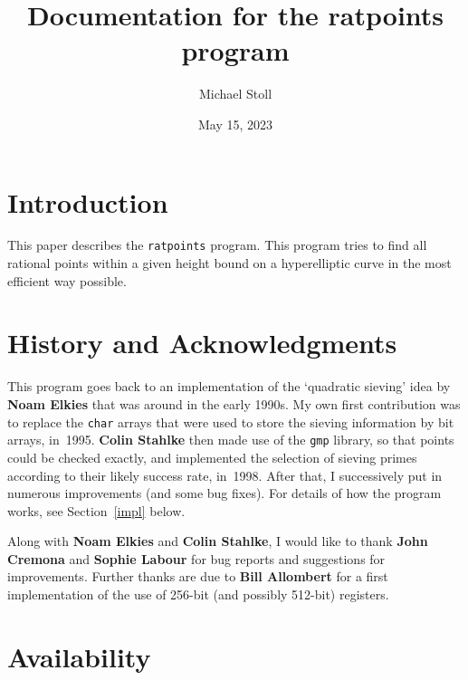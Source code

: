 \documentclass[12pt,a4paper,oneside]{amsart}
\begin{document}
\title{Documentation for the ratpoints program}

\author{Michael Stoll}
\address{Mathematisches Institut,
         Universit\"at Bayreuth,
         95440 Bayreuth, Germany.}
\date{May 15, 2023}

\maketitle


\section{Introduction}

This paper describes the \texttt{ratpoints} program. This program tries to
find all rational points within a given height bound on a hyperelliptic
curve in the most efficient way possible.


\section{History and Acknowledgments}

This program goes back to an implementation of the `quadratic sieving'
idea by \textbf{Noam Elkies} that was around in the early 1990s. My own
first contribution was to replace the \texttt{char} arrays that were used
to store the sieving information by bit arrays, in~1995. \textbf{Colin Stahlke}
then made use of the \texttt{gmp} library, so that points could be checked
exactly, and implemented the selection of sieving primes according to
their likely success rate, in~1998. After that, I successively put in
numerous improvements (and some bug fixes). For details of how the
program works, see Section~\ref{impl} below.

Along with \textbf{Noam Elkies} and \textbf{Colin Stahlke}, I would like to
thank \textbf{John Cremona} and \textbf{Sophie Labour} for bug reports and
suggestions for improvements. Further thanks are due to \textbf{Bill Allombert}
for a first implementation of the use of 256-bit (and possibly 512-bit) registers.


\section{Availability}
\end{document}
